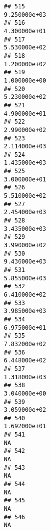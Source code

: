 \documentclass[
]{article}
\begin{document}
\begin{verbatim}
## 515                                                               9.250000e+03
## 516                                                               4.300000e+01
## 517                                                               5.530000e+02
## 518                                                               1.200000e+02
## 519                                                               1.000000e+00
## 520                                                               5.230000e+02
## 521                                                               4.900000e+01
## 522                                                               2.990000e+02
## 523                                                               2.114000e+03
## 524                                                               1.435000e+03
## 525                                                               3.000000e+01
## 526                                                               5.510000e+02
## 527                                                               2.454000e+03
## 528                                                               3.435000e+03
## 529                                                               3.990000e+02
## 530                                                               9.436000e+03
## 531                                                               5.855000e+03
## 532                                                               6.410000e+02
## 533                                                               3.985000e+03
## 534                                                               6.975000e+01
## 535                                                               7.832000e+02
## 536                                                               6.448000e+02
## 537                                                               1.318000e+03
## 538                                                               3.040000e+00
## 539                                                               3.059000e+02
## 540                                                               1.692000e+01
## 541                                                                         NA
## 542                                                                         NA
## 543                                                                         NA
## 544                                                                         NA
## 545                                                                         NA
## 546                                                                         NA

\end{verbatim}
\end{document}
